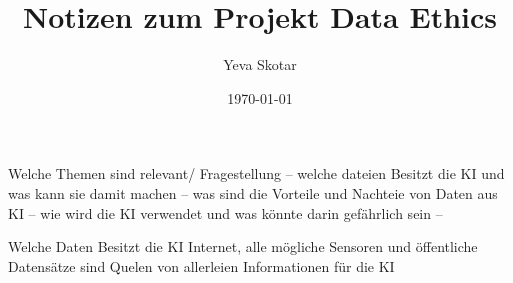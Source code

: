 \documentclass{article}
\title{Notizen zum Projekt Data Ethics}
\author{Yeva Skotar}
\date{\today}
\begin{document}
\maketitle


\tableofcontents



Welche Themen sind relevant/ Fragestellung
-- welche dateien Besitzt die KI und was kann sie damit machen  
-- was sind die Vorteile und Nachteie von Daten aus KI 
-- wie wird die KI verwendet und was könnte darin gefährlich sein 
--  


Welche Daten Besitzt die KI 
Internet, alle mögliche Sensoren und öffentliche Datensätze sind Quelen von allerleien Informationen 
für die KI 



\printbibliography
\end{document}
